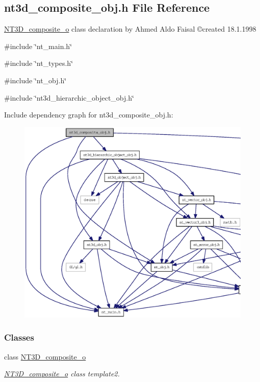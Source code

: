 \subsection{nt3d\_\-composite\_\-obj.h File Reference}
\label{nt3d__composite__obj_8h}



\begin{DoxyItemize}
\item \hyperlink{class_n_t3_d__composite__o}{NT3D\_\-composite\_\-o} class declaration by Ahmed Aldo Faisal \copyright created 18.1.1998 
\end{DoxyItemize} 


{\ttfamily \#include \char`\"{}nt\_\-main.h\char`\"{}}\par
{\ttfamily \#include \char`\"{}nt\_\-types.h\char`\"{}}\par
{\ttfamily \#include \char`\"{}nt\_\-obj.h\char`\"{}}\par
{\ttfamily \#include \char`\"{}nt3d\_\-hierarchic\_\-object\_\-obj.h\char`\"{}}\par
Include dependency graph for nt3d\_\-composite\_\-obj.h:
\nopagebreak
\begin{figure}[H]
\begin{center}
\leavevmode
\includegraphics[width=400pt]{nt3d__composite__obj_8h__incl}
\end{center}
\end{figure}
\subsubsection*{Classes}
\begin{DoxyCompactItemize}
\item 
class \hyperlink{class_n_t3_d__composite__o}{NT3D\_\-composite\_\-o}
\begin{DoxyCompactList}\small\item\em \hyperlink{class_n_t3_d__composite__o}{NT3D\_\-composite\_\-o} class template2. \item\end{DoxyCompactList}\end{DoxyCompactItemize}


